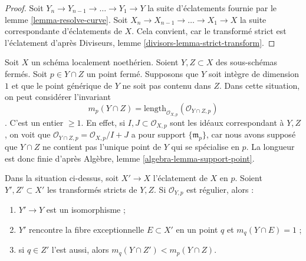 \begin{proof} Soit $Y_n \to Y_{n - 1} \to \ldots \to Y_1 \to Y$ la suite d'éclatements fournie par le lemme \ref{lemma-resolve-curve}. Soit $X_n \to X_{n - 1} \to \ldots \to X_1 \to X$ la suite correspondante d'éclatements de $X$. Cela convient, car le transformé strict est l'éclatement d'après Diviseurs, lemme \ref{divisors-lemma-strict-transform}. \end{proof}

\noindent Soit $X$ un schéma localement noethérien. Soient $Y, Z \subset X$ des sous-schémas fermés. Soit $p \in Y \cap Z$ un point fermé. Supposons que $Y$ soit intègre de dimension $1$ et que le point générique de $Y$ ne soit pas contenu dans $Z$. Dans cette situation, on peut considérer l'invariant \begin{equation}
\label{equation-multiplicity}
m_p(Y \cap Z) =
\text{length}_{\mathcal{O}_{X, p}}(\mathcal{O}_{Y \cap Z, p})
\end{equation}. C'est un entier $\geq 1$. En effet, si $I, J \subset \mathcal{O}_{X, p}$ sont les idéaux correspondant à $Y, Z$, on voit que $\mathcal{O}_{Y \cap Z, p} = \mathcal{O}_{X, p}/I + J$ a pour support $\{\mathfrak m_p\}$, car nous avons supposé que $Y \cap Z$ ne contient pas l'unique point de $Y$ qui se spécialise en $p$. La longueur est donc finie d'après Algèbre, lemme \ref{algebra-lemma-support-point}.

\begin{lemma} \label{lemma-blowup-nonsingular-curves-meeting-at-point} Dans la situation ci-dessus, soit $X' \to X$ l'éclatement de $X$ en $p$. Soient $Y', Z' \subset X'$ les transformés stricts de $Y, Z$. Si $\mathcal{O}_{Y, p}$ est régulier, alors : \begin{enumerate} \item $Y' \to Y$ est un isomorphisme ; \item $Y'$ rencontre la fibre exceptionnelle $E \subset X'$ en un point $q$ et $m_q(Y \cap E) = 1$ ; \item si $q \in Z'$ l'est aussi, alors $m_q(Y \cap Z') < m_p(Y \cap Z)$. \end{enumerate} \end{lemma}

